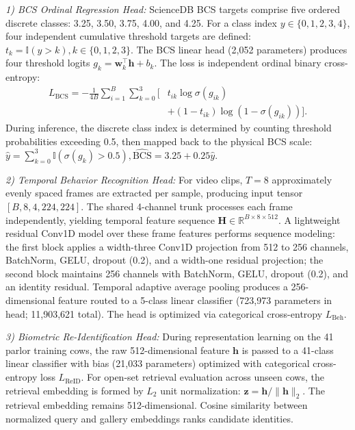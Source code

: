 \documentclass[conference]{IEEEtran}
\begin{document}
\textit{1) BCS Ordinal Regression Head:} ScienceDB BCS targets comprise five ordered discrete classes: 3.25, 3.50, 3.75, 4.00, and 4.25. For a class index $y \in \{0, 1, 2, 3, 4\}$, four independent cumulative threshold targets are defined: $t_k = \mathbb{I}(y > k), k \in \{0, 1, 2, 3\}$. The BCS linear head (2,052 parameters) produces four threshold logits $g_k = \mathbf{w}_k^\top \mathbf{h} + b_k$. The loss is independent ordinal binary cross-entropy:
\begin{equation}\label{eq:bcs_loss}
\begin{aligned}
L_{\mathrm{BCS}} = -\frac{1}{4B}\sum_{i=1}^{B}\sum_{k=0}^{3} \big[ & t_{ik}\log\sigma(g_{ik}) \\
& + (1-t_{ik})\log(1-\sigma(g_{ik})) \big].
\end{aligned}
\end{equation}
During inference, the discrete class index is determined by counting threshold probabilities exceeding 0.5, then mapped back to the physical BCS scale: $\hat{y} = \sum_{k=0}^{3} \mathbb{I}(\sigma(g_k) > 0.5), \widehat{\mathrm{BCS}} = 3.25 + 0.25\hat{y}$.

\textit{2) Temporal Behavior Recognition Head:} For video clips, $T=8$ approximately evenly spaced frames are extracted per sample, producing input tensor $[B, 8, 4, 224, 224]$. The shared 4-channel trunk processes each frame independently, yielding temporal feature sequence $\mathbf{H} \in \mathbb{R}^{B \times 8 \times 512}$. A lightweight residual Conv1D model over these frame features performs sequence modeling: the first block applies a width-three Conv1D projection from 512 to 256 channels, BatchNorm, GELU, dropout (0.2), and a width-one residual projection; the second block maintains 256 channels with BatchNorm, GELU, dropout (0.2), and an identity residual. Temporal adaptive average pooling produces a 256-dimensional feature routed to a 5-class linear classifier (723,973 parameters in head; 11,903,621 total). The head is optimized via categorical cross-entropy $L_{\mathrm{Beh}}$.

\textit{3) Biometric Re-Identification Head:} During representation learning on the 41 parlor training cows, the raw 512-dimensional feature $\mathbf{h}$ is passed to a 41-class linear classifier with bias (21,033 parameters) optimized with categorical cross-entropy loss $L_{\mathrm{ReID}}$. For open-set retrieval evaluation across unseen cows, the retrieval embedding is formed by $L_2$ unit normalization: $\mathbf{z} = \mathbf{h} / \|\mathbf{h}\|_2$. The retrieval embedding remains 512-dimensional. Cosine similarity between normalized query and gallery embeddings ranks candidate identities.
\end{document}
